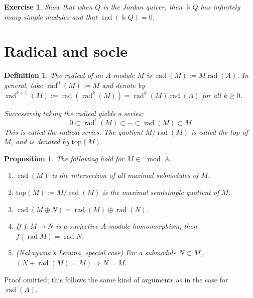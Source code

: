 \documentclass[11pt,a4paper]{article}
\numberwithin{equation}{section}
\theoremstyle{all}
\newtheorem{proposition}[theorem]{Proposition}
\newtheorem{definition}[theorem]{Definition}
\newtheorem{exercise}[theorem]{Exercise}
\theoremstyle{remark}
\newcommand{\rad}{\operatorname{rad}\nolimits}
\newcommand{\defn}[1]{\textsl{\color{darkblue} #1}}
\begin{document}
\begin{exercise}
Show that when $Q$ is the Jordan quiver, then $\Bbbk Q$ has infinitely many simple modules and that $\rad(\Bbbk Q)=0$.
\end{exercise}


\pagebreak


\section{Radical and socle}

\begin{definition}
The \defn{radical} of an $A$-module $M$ is $\rad(M):=M\rad(A)$.  In general, take $\rad^0(M):=M$ and denote by $\rad^{k+1}(M):=\rad(\rad^k(M))=\rad^k(M)\rad(A)$ for all $k\geq 0$.

Successively taking the radical yields a series:
\[
0\subset \rad^\ell(M) \subset \cdots \subset \rad(M) \subset M
\]
This is called the \defn{radical series}.
The quotient $M/\rad(M)$ is called the \defn{top} of $M$, and is denoted by $\mathrm{top}(M)$.
\end{definition}

\begin{proposition}\label{prop:rad(M)}
The following hold for $M\in\mod A$.
\begin{enumerate}
\item $\rad(M)$ is the intersection of all maximal submodules of $M$.
\item $\mathrm{top}(M):=M/\rad(M)$ is the maximal semisimple quotient of $M$.
\item $\rad(M\oplus N) = \rad(M)\oplus\rad(N)$.

\item If $f:M\to N$ is a surjective $A$-module homomorphism, then $f(\rad M) = \rad N$.
\item (Nakayama's Lemma, special case) For a submodule $N\subset M$, $(N+\rad(M)=M) \Rightarrow N=M$.
\end{enumerate}
\end{proposition}

Proof omitted; this follows the same kind of arguments as in the case for $\rad(A)$.
\end{document}
